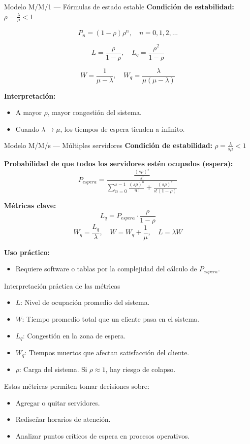 \documentclass{beamer}
\begin{document}
\begin{frame}{Modelo M/M/1 — Fórmulas de estado estable}
\textbf{Condición de estabilidad:} \( \rho = \frac{\lambda}{\mu} < 1 \)

\[
P_n = (1 - \rho) \rho^n, \quad n = 0, 1, 2, \dots
\]

\[
L = \frac{\rho}{1 - \rho}, \quad L_q = \frac{\rho^2}{1 - \rho}
\]

\[
W = \frac{1}{\mu - \lambda}, \quad W_q = \frac{\lambda}{\mu (\mu - \lambda)}
\]

\textbf{Interpretación:}
\begin{itemize}
    \item A mayor \( \rho \), mayor congestión del sistema.
    \item Cuando \( \lambda \to \mu \), los tiempos de espera tienden a infinito.
\end{itemize}
\end{frame}

\begin{frame}{Modelo M/M/s — Múltiples servidores}
\textbf{Condición de estabilidad:} \( \rho = \frac{\lambda}{s \mu} < 1 \)

\textbf{Probabilidad de que todos los servidores estén ocupados (espera):}
\[
P_{espera} = \frac{\frac{(s \rho)^s}{s!}}{\sum_{n=0}^{s-1} \frac{(s \rho)^n}{n!} + \frac{(s \rho)^s}{s!(1 - \rho)}}
\]

\textbf{Métricas clave:}
\[
L_q = P_{espera} \cdot \frac{\rho}{1 - \rho}
\]
\[
W_q = \frac{L_q}{\lambda}, \quad W = W_q + \frac{1}{\mu}, \quad L = \lambda W
\]

\textbf{Uso práctico:}
\begin{itemize}
    \item Requiere software o tablas por la complejidad del cálculo de \( P_{espera} \).
\end{itemize}
\end{frame}

\begin{frame}{Interpretación práctica de las métricas}
\begin{itemize}
    \item \( L \): Nivel de ocupación promedio del sistema.
    \item \( W \): Tiempo promedio total que un cliente pasa en el sistema.
    \item \( L_q \): Congestión en la zona de espera.
    \item \( W_q \): Tiempos muertos que afectan satisfacción del cliente.
    \item \( \rho \): Carga del sistema. Si \( \rho \approx 1 \), hay riesgo de colapso.
\end{itemize}

\vspace{0.3cm}
Estas métricas permiten tomar decisiones sobre:
\begin{itemize}
    \item Agregar o quitar servidores.
    \item Rediseñar horarios de atención.
    \item Analizar puntos críticos de espera en procesos operativos.
\end{itemize}
\end{frame}
\end{document}
